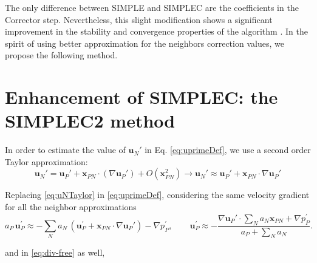 \documentclass[final,3p,times,10pt,onecolumn]{myElsarticle}
\numberwithin{equation}{section}
\begin{document}
The only difference between SIMPLE and SIMPLEC are the coefficients in the Corrector step. Nevertheless, this slight modification shows a significant improvement in the stability  and convergence properties of the algorithm \cite{liu}. In the spirit of using better approximation for the neighbors correction values, we propose the following method.

\section{Enhancement of SIMPLEC: the SIMPLEC2 method}
\label{sec:SIMPLEC2}

In order to estimate the value of $\boldsymbol{u}_N'$ in Eq. \ref{eq:uprimeDef}, we use a second order Taylor approximation:
\begin{equation}\label{eq:uNTaylor}
\boldsymbol{u}_N' = \boldsymbol{u}_P' + \boldsymbol{x}_{PN}\cdot \left(\nabla \boldsymbol{u}_P'\right) + \mathcal{}{O}(\boldsymbol{x}_{PN}^2) \rightarrow \boldsymbol{u}_N' \approx \boldsymbol{u}_P' + \boldsymbol{x}_{PN}\cdot \nabla \boldsymbol{u}_P'
\end{equation}

Replacing \ref{eq:uNTaylor} in \ref{eq:uprimeDef}, considering the same velocity gradient for all the neighbor approximations
\begin{equation}\label{eq:uPrimeSIMPLEC2}
a_P\,\boldsymbol{u}_P^{'} \approx -\sum_{N} a_{N}\, \left(\boldsymbol{u}_P^{'} + \boldsymbol{x}_{PN}\cdot \nabla \boldsymbol{u}_P'\right)- \nabla p_P^{'}, \qquad \boldsymbol{u}_P^{'} \approx - \frac{\nabla \boldsymbol{u}_P' \cdot \sum_{N} a_{N}\boldsymbol{x}_{PN} + \nabla p_P^{'}}{a_P + \sum_{N} a_{N}} .
\end{equation}

\noindent and in \ref{eq:div-free} as well,
\end{document}
